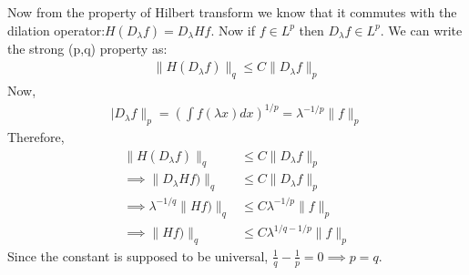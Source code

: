 \documentclass{article}
\begin{document}
Now from the property of Hilbert transform we know that it commutes with the dilation operator:$H(D_{\lambda}f) = D_{\lambda} Hf$. Now if $f \in L^p$ then $D_{\lambda}f \in L^p$. We can write the strong (p,q) property as:
\begin{gather*}
    \lVert H(D_{\lambda}f)\rVert_{q} \leq C\lVert D_{\lambda}f\rVert_p
\end{gather*}
Now,
\begin{gather*}
    \lvert D_{\lambda}f \rVert_p = \left( \int f(\lambda x) dx\right)^{1/p} = \lambda^{-1/p}\lVert f \rVert_p
\end{gather*}
Therefore,
\begin{align*}
    \lVert H(D_{\lambda}f)\rVert_{q} &\leq C\lVert D_{\lambda}f\rVert_p \\
    \implies \lVert D_{\lambda}Hf)\rVert_{q} &\leq C\lVert D_{\lambda}f\rVert_p \\
    \implies \lambda^{-1/q} \lVert Hf)\rVert_{q} &\leq C\lambda^{-1/p}\lVert f\rVert_p\\
    \implies \lVert Hf)\rVert_{q} &\leq C\lambda^{1/q-1/p}\lVert f\rVert_p
\end{align*}
Since the constant is supposed to be universal, $\frac{1}{q} - \frac{1}{p} = 0 \implies p=q$.
\end{document}
